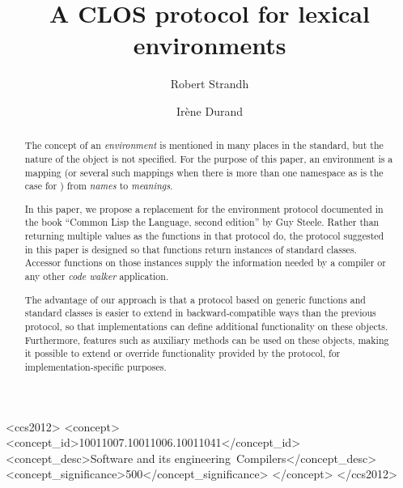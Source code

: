 \documentclass[format=sigconf]{acmart}
\def\inputtex#1{}
\begin{document}
\title{A CLOS protocol for lexical environments}

\author{Robert Strandh}

\author{Irène Durand
}

\begin{abstract}
The concept of an \emph{environment} is mentioned in many places in
the \commonlisp{} standard, but the nature of the object is not
specified.  For the purpose of this paper, an environment is a mapping
(or several such mappings when there is more than one namespace as is
the case for \commonlisp{}) from \emph{names} to \emph{meanings}.

In this paper, we propose a replacement for the environment protocol
documented in the book ``Common Lisp the Language, second edition'' by
Guy Steele.  Rather than returning multiple values as the functions in
that protocol do, the protocol suggested in this paper is designed so
that functions return instances of standard classes.  Accessor
functions on those instances supply the information needed by a
compiler or any other \emph{code walker} application.

The advantage of our approach is that a protocol based on generic
functions and standard classes is easier to extend in
backward-compatible ways than the previous protocol, so that
implementations can define additional functionality on these objects.
Furthermore, \clos{} features such as auxiliary methods can be used on
these objects, making it possible to extend or override functionality
provided by the protocol, for implementation-specific purposes.
\end{abstract}

\begin{CCSXML}
<ccs2012>
<concept>
<concept_id>10011007.10011006.10011041</concept_id>
<concept_desc>Software and its engineering~Compilers</concept_desc>
<concept_significance>500</concept_significance>
</concept>
</ccs2012>
\end{CCSXML}



\maketitle

\inputtex{spec-macros.tex}

\inputtex{sec-introduction.tex}
\inputtex{sec-previous.tex}
\inputtex{sec-our-method.tex}
\inputtex{sec-benefits.tex}
\inputtex{sec-disadvantages.tex}
\inputtex{sec-conclusions.tex}
\inputtex{sec-acknowledgements.tex}



\end{document}
